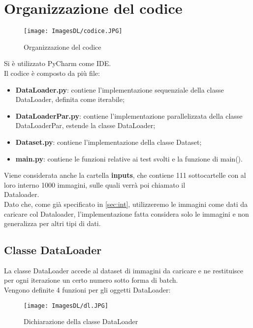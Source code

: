 \documentclass[10pt,twocolumn,letterpaper]{article}
\newcommand{\bit} {\begin{itemize} }
\newcommand{\eit} {\end{itemize} }
\begin{document}
\section{Organizzazione del codice}

\begin{figure}[h]
    \centering
    \texttt{[image: ImagesDL/codice.JPG]}
    \caption{Organizzazione del codice}
    \label{fig:cod}
\end{figure}

Si è utilizzato PyCharm come IDE.\\
Il codice è composto da più file:

\bit
    \item{\textbf{DataLoader.py}: contiene l'implementazione sequenziale della classe DataLoader, definita come iterabile;}
    \item{\textbf{DataLoaderPar.py}: contiene l'implementazione parallelizzata della classe DataLoaderPar, estende la classe DataLoader;}
    \item{\textbf{Dataset.py}: contiene l'implementazione della classe Dataset;}
    \item{\textbf{main.py}:  contiene le funzioni relative ai test svolti e la funzione di main().}
\eit

Viene considerata anche la cartella \textbf{inputs}, che contiene 111 sottocartelle con al loro interno 1000 immagini, sulle quali verrà poi chiamato il \\ Dataloader.\\
Dato che, come già specificato in \cref{sec:int}, utilizzeremo le immagini come dati da caricare col Dataloader, l'implementazione fatta considera solo le immagini e non generalizza per altri tipi di dati.

\subsection{Classe DataLoader}
La classe DataLoader accede al dataset di immagini da caricare e ne restituisce per ogni iterazione un certo numero sotto forma di batch.\\
Vengono definite 4 funzioni per gli oggetti DataLoader:

\begin{figure}[h]
    \centering
    \texttt{[image: ImagesDL/dl.JPG]}
    \caption{Dichiarazione della classe DataLoader}
    \label{fig:dl}
\end{figure}
\end{document}
